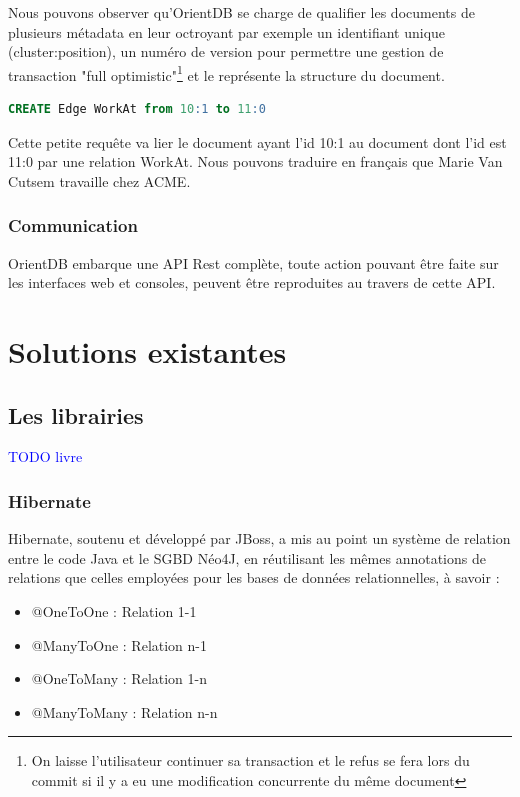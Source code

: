 \documentclass[a4paper,fleqn,12pt]{report}
\begin{document}
Nous pouvons observer qu'OrientDB se charge de qualifier les documents de plusieurs métadata en leur octroyant par exemple un identifiant unique (\no cluster:position), un numéro de version pour permettre une gestion de transaction "full optimistic"\footnote{On laisse l'utilisateur continuer sa transaction et le refus se fera lors du commit si il y a eu une modification concurrente du même document} et le \@class représente la structure du document.

\begin{lstlisting}[language=SQL]
CREATE Edge WorkAt from 10:1 to 11:0
\end{lstlisting}

Cette petite requête va lier le document ayant l'id 10:1 au document dont l'id est 11:0 par une relation WorkAt. Nous pouvons traduire en français que Marie Van Cutsem travaille chez ACME.\cite{OrientDBGettingStarted}


\subsection{Communication}

OrientDB embarque une API Rest complète\cite{fielding2000architectural}, toute action pouvant être faite sur les interfaces web et consoles, peuvent être reproduites au travers de cette API.




\chapter{Solutions existantes}


\section{Les librairies} 

\textcolor{blue}{TODO livre}

\subsection{Hibernate}

Hibernate, soutenu et développé par JBoss, a mis au point un système de relation entre le code Java et le SGBD Néo4J, en réutilisant les mêmes annotations de relations que celles employées pour les bases de données relationnelles, à savoir :

\begin{itemize}
\item @OneToOne : Relation 1-1
\item @ManyToOne : Relation n-1
\item @OneToMany : Relation 1-n
\item @ManyToMany : Relation n-n
\end{itemize}
\end{document}
